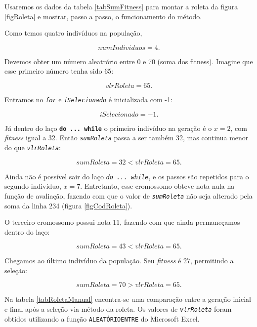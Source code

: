 	Usaremos os dados da tabela \ref{tabSumFitness} para montar a roleta da figura \ref{figRoleta} e mostrar, passo a passo, o funcionamento do método.
	
	Como temos quatro indivíduos na população,
	
	$$
	numIndividuos = 4.
	$$

	Devemos obter um número aleatrório entre 0 e 70 (soma dos fitness). Imagine que esse primeiro número tenha sido 65:
	
	$$
	vlrRoleta = 65.
	$$
	
	Entramos no \textit{\texttt{for}} e \textit{\texttt{iSelecionado}} é inicializada com -1:
	
	$$
	iSelecionado = -1.
	$$
	
	Já dentro do laço \textbf{\texttt{do ... while}} o primeiro indivíduo na geração é o $x = 2$, com \textit{fitness} igual a 32. Então \textit{\texttt{sumRoleta}} passa a ser também 32, mas continua menor do que \textit{\texttt{vlrRoleta}}:
	
	$$
		sumRoleta = 32 < vlrRoleta = 65.
	$$
	
	Ainda não é possível sair do laço \textit{\texttt{do ... while}}, e os passos são repetidos para o segundo indivíduo, $x = 7$. Entretanto, esse cromossomo obteve nota nula na função de avaliação, fazendo com que o valor de \textit{\texttt{sumRoleta}} não seja alterado pela soma da linha 234 (figura \ref{figCodRoleta}).
	
	O terceiro cromossomo possui nota 11, fazendo com que ainda permaneçamos dentro do laço:
	
	$$
		sumRoleta = 43 < vlrRoleta = 65.
	$$
	
	Chegamos ao último indivíduo da população. Seu \textit{fitness} é 27, permitindo a seleção:
	
	$$
		sumRoleta = 70 > vlrRoleta = 65.
	$$
	
	Na tabela \ref{tabRoletaManual} encontra-se uma comparação entre a geração inicial e final após a seleção via método da roleta. Os valores de \textit{\texttt{vlrRoleta}} foram obtidos utilizando a função \texttt{ALEATÓRIOENTRE} do Microsoft Excel.
	
